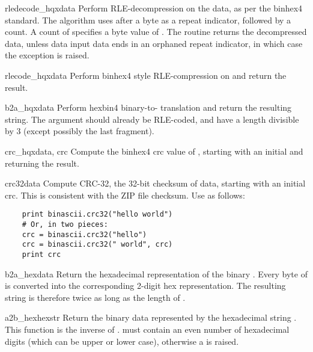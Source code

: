 \begin{funcdesc}{rledecode_hqx}{data}
Perform RLE-decompression on the data, as per the binhex4
standard. The algorithm uses  after a byte as a repeat
indicator, followed by a count. A count of  specifies a byte
value of . The routine returns the decompressed data,
unless data input data ends in an orphaned repeat indicator, in which
case the  exception is raised.
\end{funcdesc}

\begin{funcdesc}{rlecode_hqx}{data}
Perform binhex4 style RLE-compression on  and return the
result.
\end{funcdesc}

\begin{funcdesc}{b2a_hqx}{data}
Perform hexbin4 binary-to-\ASCII{} translation and return the
resulting string. The argument should already be RLE-coded, and have a
length divisible by 3 (except possibly the last fragment).
\end{funcdesc}

\begin{funcdesc}{crc_hqx}{data, crc}
Compute the binhex4 crc value of , starting with an initial
 and returning the result.
\end{funcdesc}

\begin{funcdesc}{crc32}{data}
Compute CRC-32, the 32-bit checksum of data, starting with an initial
crc.  This is consistent with the ZIP file checksum.  Use as follows:
\begin{verbatim}
    print binascii.crc32("hello world")
    # Or, in two pieces:
    crc = binascii.crc32("hello")
    crc = binascii.crc32(" world", crc)
    print crc
\end{verbatim}
\end{funcdesc}
 
\begin{funcdesc}{b2a_hex}{data}
Return the hexadecimal representation of the binary .  Every
byte of  is converted into the corresponding 2-digit hex
representation.  The resulting string is therefore twice as long as
the length of .
\end{funcdesc}

\begin{funcdesc}{a2b_hex}{hexstr}
Return the binary data represented by the hexadecimal string
.  This function is the inverse of .
 must contain an even number of hexadecimal digits (which
can be upper or lower case), otherwise a  is
raised.
\end{funcdesc}

